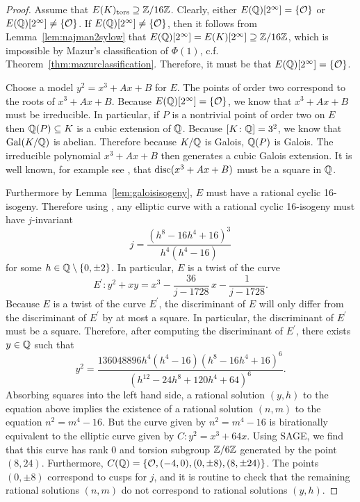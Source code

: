 \begin{proof} 
Assume that $E(K)_{\text{tors}} \supseteq \mathbb{Z}/16\mathbb{Z}$. Clearly, either $E(\mathbb{Q})[2^\infty]= \{ \mathcal{O} \}$ or $E(\mathbb{Q})[2^\infty] \neq \{ \mathcal{O} \}$. If $E(\mathbb{Q})[2^\infty] \neq \{ \mathcal{O} \}$, then it follows from Lemma~\ref{lem:najman2sylow} that $E(\mathbb{Q})[2^\infty]= E(K)[2^\infty] \supseteq \mathbb{Z}/16\mathbb{Z}$, which is impossible by Mazur's classification of $\Phi(1)$, c.f. Theorem~\ref{thm:mazurclassification}. Therefore, it must be that $E(\mathbb{Q})[2^\infty]= \{ \mathcal{O} \}$. 

Choose a model $y^2= x^3 + Ax + B$ for $E$. The points of order two correspond to the roots of $x^3 + Ax +B$. Because $E(\mathbb{Q})[2^\infty]= \{ \mathcal{O} \}$, we know that $x^3 + Ax + B$ must be irreducible. In particular, if $P$ is a nontrivial point of order two on $E$ then $\mathbb{Q}(P) \subseteq K$ is a cubic extension of $\mathbb{Q}$. Because $[K \colon \mathbb{Q}]= 3^2$, we know that $\operatorname{Gal}(K/\mathbb{Q})$ is abelian. Therefore because $K/\mathbb{Q}$ is Galois, $\mathbb{Q}(P)$ is Galois. The irreducible polynomial $x^3 + Ax + B$ then generates a cubic Galois extension. It is well known, for example see \cite{dummitfoote,conradcubic}, that $\operatorname{disc}(x^3 + Ax + B)$ must be a square in $\mathbb{Q}$. 

Furthermore by Lemma~\ref{lem:galoisisogeny}, $E$ must have a rational cyclic 16-isogeny. Therefore using \cite[Table~3]{lozanorobledo13}, any elliptic curve with a rational cyclic 16-isogeny must have $j$-invariant
	\[
	j= \dfrac{(h^8-16h^4+16)^3}{h^4(h^4-16)}
	\]
for some $h \in \mathbb{Q} \setminus \{ 0, \pm 2 \}$. In particular, $E$ is a twist of the curve
	\[
	E^\prime \colon y^2 + xy = x^3 - \dfrac{36}{j - 1728} \,x - \dfrac{1}{j-1728}.
	\]
Because $E$ is a twist of the curve $E^\prime$, the discriminant of $E$ will only differ from the discriminant of $E^\prime$ by at most a square. In particular, the discriminant of $E^\prime$ must be a square. Therefore, after computing the discriminant of $E^\prime$, there exists $y \in \mathbb{Q}$ such that
	\[
	y^2=  \dfrac{136048896h^4(h^4-16)(h^8-16h^4+16)^6}{(h^{12}-24h^8+120h^4+64)^6}.
	\]
Absorbing squares into the left hand side, a rational solution $(y,h)$ to the equation above implies the existence of a rational solution $(n,m)$ to the equation $n^2= m^4 - 16$. But the curve given by $n^2= m^4 - 16$ is birationally equivalent to the elliptic curve given by $C \colon y^2= x^3 + 64x$. Using SAGE, we find that this curve has rank 0 and torsion subgroup $\mathbb{Z}/6\mathbb{Z}$ generated by the point $(8,24)$. Furthermore, $C(\mathbb{Q})= \{ \mathcal{O}, (-4,0), (0, \pm 8), (8, \pm 24) \}$. The points $(0,\pm 8)$ correspond to cusps for $j$, and it is routine to check that the remaining rational solutions $(n,m)$ do not correspond to rational solutions $(y,h)$. 
\end{proof}



